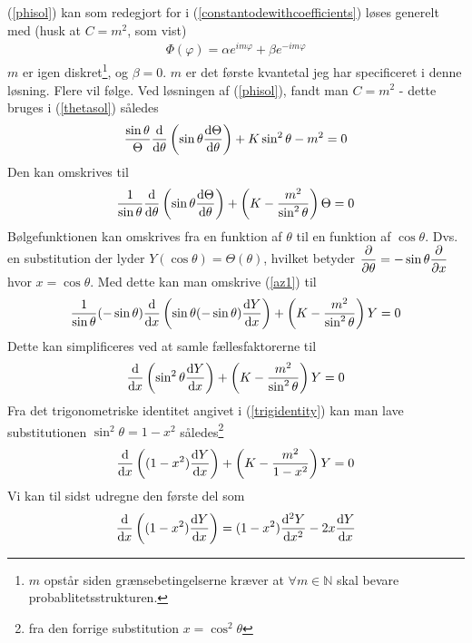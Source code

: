 \documentclass[12pt]{article}
\theoremstyle{definition}
\theoremstyle{remark}
\theoremstyle{definition}
\numberwithin{equation}{section}
\begin{document}
(\ref{phisol}) kan som redegjort for i (\ref{constantodewithcoefficients}) løses generelt med (husk at $C=m^2$, som vist) 
\begin{align}
    \Phi(\varphi) = \alpha e^{im\varphi}+\beta e^{-im\varphi}
\end{align}
$m$ er igen diskret\footnote{$m$ opstår siden grænsebetingelserne kræver at $\forall m\in \mathbb N$ skal bevare probablitetsstrukturen.}, og $\beta=0$. $m$ er det første kvantetal jeg har specificeret i denne løsning. Flere vil følge. Ved løsningen af (\ref{phisol}), fandt man $C=m^2$ - dette bruges i (\ref{thetasol}) således
\begin{align}
    \frac{\sin\theta}{\Theta}\frac{\rm d}{{\rm d}\theta}\left(\sin\theta\frac{{\rm d}\Theta}{{\rm d}\theta}\right)+K\sin^2\theta-m^2=0
\end{align}
Den kan omskrives til
\begin{align}
\label{az1}
    \frac{1}{\sin\theta}\frac{\rm d}{{\rm d}\theta}\left(\sin\theta\frac{{\rm d}\Theta}{{\rm d}\theta}\right)+\left(K-\frac{m^2}{\sin^2\theta}\right)\Theta=0
\end{align}
Bølgefunktionen kan omskrives fra en funktion af $\theta$ til en funktion af $\cos \theta$. Dvs. en substitution der lyder $Y(\cos \theta) = \Theta(\theta)$, hvilket betyder $\displaystyle \pdv{\theta} = -\sin \theta \pdv{x}$ hvor $x=\cos \theta$. Med dette kan man omskrive (\ref{az1}) til
\begin{align}
    \frac{1}{\sin\theta}(-\sin\theta)\frac{\rm d}{{\rm d}x}\left(\sin\theta(-\sin\theta)\frac{{\rm d}Y}{{\rm d}x}\right)+\left(K-\frac{m^2}{\sin^2\theta}\right)Y=0
\end{align}
Dette kan simplificeres ved at samle fællesfaktorerne til
\begin{align}
    \frac{\rm d}{{\rm d}x}\left(\sin^2\theta\frac{{\rm d}Y}{{\rm d}x}\right)+\left(K-\frac{m^2}{\sin^2\theta}\right)Y=0
\end{align}
Fra det trigonometriske identitet angivet i (\ref{trigidentity}) kan man lave substitutionen $\sin^2\theta = 1-x^2$ således\footnote{fra den forrige substitution $x=\cos^2\theta$}
\begin{align}
    \frac{\rm d}{{\rm d}x}\left((1-x^2)\frac{{\rm d}Y}{{\rm d}x}\right)+\left(K-\frac{m^2}{1-x^2}\right)Y=0
\end{align}
Vi kan til sidst udregne den første del som
\begin{align}
    \frac{\rm d}{{\rm d}x}\left((1-x^2)\frac{{\rm d}Y}{{\rm d}x}\right) = (1-x^2)\frac{{\rm d}^2Y}{{\rm d}x^2}-2x\frac{{\rm d}Y}{{\rm d}x}
\end{align}
\end{document}
